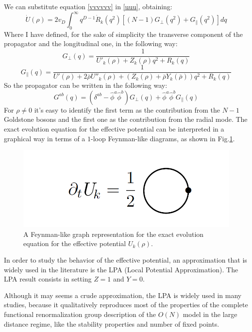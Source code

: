 We can substitute equation \eqref{vvvvvv} in  \eqref{uuu}, obtaining:
\begin{equation}\label{upunto}
\dot{U}(\rho) =   2v_D  \int_0^\infty q^{D-1}  \dot{R}_k(q^2) \left[  {(N-1)}{G_\perp(q^2)}  + {G_\parallel(q^2)}\right] dq
\end{equation}
Where I have defined, for the sake of simplicity the transverse component of the propagator and the longitudinal one, in the following way:
$$G_\perp (q)= \frac{1}{U'_k(\rho) +  Z_k({\rho})q^2 + R_k(q) } $$
$$G_\parallel (q) = \frac{1}{U'(\rho) + 2\bar{\rho}U''_k(\rho) +  (Z_k({\rho}) + \bar{\rho}Y_k(\bar{\rho}))q^2 + R_k(q)}$$
So the propagator can be written in the following way:
\begin{equation}
 G^{ab}(q) = (\delta^{ab} - \widehat{\phi}^a\widehat{\phi}^b)G_\perp (q) + \widehat{\phi}^a\widehat{\phi}^bG_\parallel (q)
\end{equation}
For $\rho \neq 0$ it's easy to identify the first term as the contribution from the $N-1$ Goldstone bosons and the first one as the contribution from the radial mode.
The exact evolution equation for the effective potential can be interpreted in a graphical way in terms of a $1$-loop Feynman-like diagrams, as shown in Fig.\ref{fig:looppot}.
\begin{figure}
\begin{center}
\includegraphics[scale=0.4]{Immagini/potenziale.png}
\caption{A Feynman-like graph representation for the exact evolution equation for the effective potential $U_k(\rho)$.}
\label{fig:looppot}
\end{center}
\end{figure}

In order to study the behavior of the effective potential, an approximation that is widely used in the literature is the LPA (Local Potential Approximation).
The LPA result consists in setting $Z=1$ and $Y=0$.

Although it may seems a crude approximation, the LPA is widely used in many studies, because it qualitatively reproduces most of the properties of the complete functional renormalization group description of the $O(N)$ 
model in the large distance regime, like the stability properties and number of fixed points.


